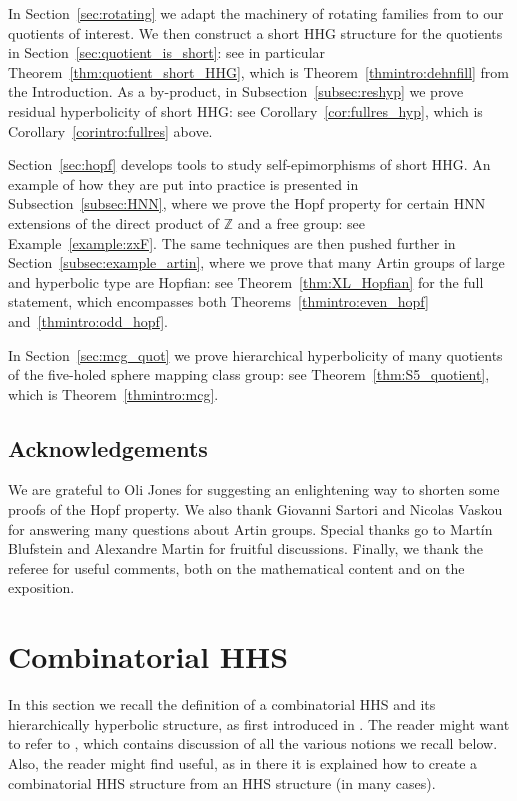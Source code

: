 \documentclass[svgnames]{amsart}
\theoremstyle{plain}
\theoremstyle{definition}
\newcommand{\Z}{\mathbb{Z}}
\begin{document}
In Section~\ref{sec:rotating} we adapt the machinery of rotating families from \cite{dahmani:rotating, dfdt} to our quotients of interest. We then construct a short HHG structure for the quotients in Section~\ref{sec:quotient_is_short}: see in particular Theorem~\ref{thm:quotient_short_HHG}, which is Theorem~\ref{thmintro:dehnfill} from the Introduction. As a by-product, in Subsection~\ref{subsec:reshyp} we prove residual hyperbolicity of short HHG: see Corollary~\ref{cor:fullres_hyp}, which is Corollary~\ref{corintro:fullres} above.

\par\medskip
Section~\ref{sec:hopf} develops tools to study self-epimorphisms of short HHG. An example of how they are put into practice is presented in Subsection~\ref{subsec:HNN}, where we prove the Hopf property for certain HNN extensions of the direct product of $\Z$ and a free group: see Example~\ref{example:zxF}. The same techniques are then pushed further in Section~\ref{subsec:example_artin}, where we prove that many Artin groups of large and hyperbolic type are Hopfian: see Theorem~\ref{thm:XL_Hopfian} for the full statement, which encompasses both Theorems~\ref{thmintro:even_hopf} and~\ref{thmintro:odd_hopf}. 
\par\medskip
In Section~\ref{sec:mcg_quot} we prove hierarchical hyperbolicity of many quotients of the five-holed sphere mapping class group: see Theorem~\ref{thm:S5_quotient}, which is Theorem~\ref{thmintro:mcg}. 

\subsection*{Acknowledgements}
We are grateful to Oli Jones for suggesting an enlightening way to shorten some proofs of the Hopf property. We also thank Giovanni Sartori and Nicolas Vaskou for answering many questions about Artin groups. Special thanks go to Martín Blufstein and Alexandre Martin for fruitful discussions. Finally, we thank the referee for useful comments, both on the mathematical content and on the exposition.



\section{Combinatorial HHS}\label{sec:what_is_CHHS} 
In this section we recall the definition of a combinatorial HHS and its hierarchically hyperbolic structure, as first introduced in \cite{BHMS}. The reader might want to refer to \cite[Section 1]{BHMS}, which contains discussion of all the various notions we recall below. Also, the reader might find \cite{converse} useful, as in there it is explained how to create a combinatorial HHS structure from an HHS structure (in many cases).
\end{document}

